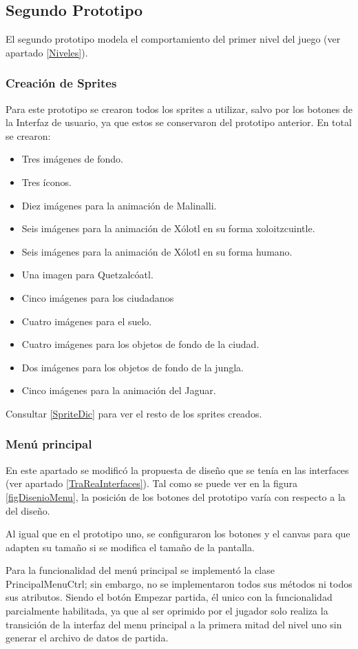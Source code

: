 \subsection{Segundo Prototipo}
El segundo prototipo modela el comportamiento del primer nivel del juego (ver 
apartado \ref{Niveles}). 

\subsubsection{Creación de Sprites}
Para este prototipo se crearon todos los sprites a utilizar, salvo por los botones 
de la Interfaz de usuario, ya que estos se conservaron del prototipo anterior. En 
total se crearon:
\begin{itemize}
	\item Tres imágenes de fondo.
	\item Tres íconos.
	\item Diez imágenes para la animación de Malinalli.
	\item Seis imágenes para la animación de Xólotl en su forma xoloitzcuintle.
	\item Seis imágenes para la animación de Xólotl en su forma humano.
	\item Una imagen para Quetzalcóatl.
	\item Cinco imágenes para los ciudadanos
	\item Cuatro imágenes para el suelo.
	\item Cuatro imágenes para los objetos de fondo de la ciudad.
	\item Dos imágenes para los objetos de fondo de la jungla.
	\item Cinco imágenes para la animación del Jaguar.
\end{itemize}  
Consultar \ref{SpriteDic} para ver el resto de los sprites creados.

\subsubsection{Menú principal}
En este apartado se modificó la propuesta de diseño que se tenía en las interfaces 
(ver apartado \ref{TraReaInterfaces}). Tal como se puede ver en la figura 
\ref{figDisenioMenu}, la posición de los botones del prototipo varía con 
respecto a la del diseño. 
\\
\par
Al igual que en el prototipo uno, se configuraron los botones y el 
canvas para que adapten su tamaño si se modifica el tamaño de la 
pantalla.
\\
\par
Para la funcionalidad del menú principal se implementó la clase PrincipalMenuCtrl; 
sin embargo, no se implementaron todos sus métodos ni todos sus atributos. Siendo 
el botón Empezar partida, él unico con la funcionalidad parcialmente habilitada, 
ya que al ser oprimido por el jugador solo realiza la transición de la interfaz del 
menu principal a la primera mitad del nivel uno sin generar el archivo de datos 
de partida.
\\
\par


